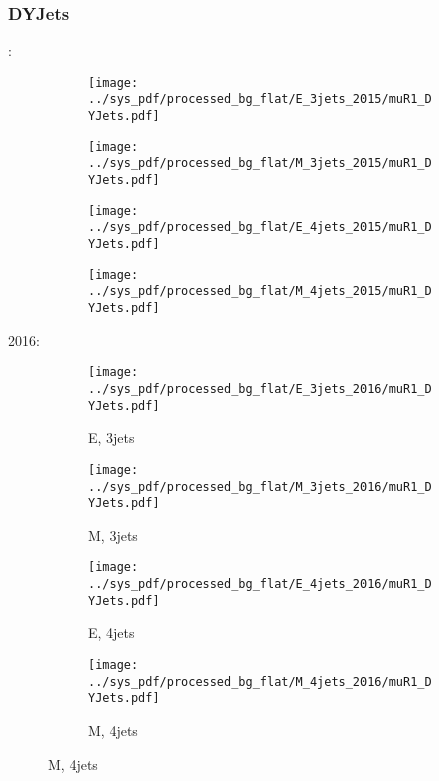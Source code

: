 \documentclass{beamer}
\begin{document}
\begin{frame}
\frametitle{DYJets}
\fontsize{5}{1}:
\begin{figure}
\centering
\begin{subfigure}[b]{0.24\textwidth}
\texttt{[image: ../sys\_pdf/processed\_bg\_flat/E\_3jets\_2015/muR1\_DYJets.pdf]}
\end{subfigure}
\begin{subfigure}[b]{0.24\textwidth}
\texttt{[image: ../sys\_pdf/processed\_bg\_flat/M\_3jets\_2015/muR1\_DYJets.pdf]}
\end{subfigure}
\begin{subfigure}[b]{0.24\textwidth}
\texttt{[image: ../sys\_pdf/processed\_bg\_flat/E\_4jets\_2015/muR1\_DYJets.pdf]}
\end{subfigure}
\begin{subfigure}[b]{0.24\textwidth}
\texttt{[image: ../sys\_pdf/processed\_bg\_flat/M\_4jets\_2015/muR1\_DYJets.pdf]}
\end{subfigure}
\end{figure}
2016:
\begin{figure}
\centering
\begin{subfigure}[b]{0.24\textwidth}
\texttt{[image: ../sys\_pdf/processed\_bg\_flat/E\_3jets\_2016/muR1\_DYJets.pdf]}
\captionsetup{font=tiny}
\caption{E, 3jets}
\end{subfigure}
\begin{subfigure}[b]{0.24\textwidth}
\texttt{[image: ../sys\_pdf/processed\_bg\_flat/M\_3jets\_2016/muR1\_DYJets.pdf]}
\captionsetup{font=tiny}
\caption{M, 3jets}
\end{subfigure}
\begin{subfigure}[b]{0.24\textwidth}
\texttt{[image: ../sys\_pdf/processed\_bg\_flat/E\_4jets\_2016/muR1\_DYJets.pdf]}
\captionsetup{font=tiny}
\caption{E, 4jets}
\end{subfigure}
\begin{subfigure}[b]{0.24\textwidth}
\texttt{[image: ../sys\_pdf/processed\_bg\_flat/M\_4jets\_2016/muR1\_DYJets.pdf]}
\captionsetup{font=tiny}
\caption{M, 4jets}
\end{subfigure}
\end{figure}
\end{frame}
\end{document}
